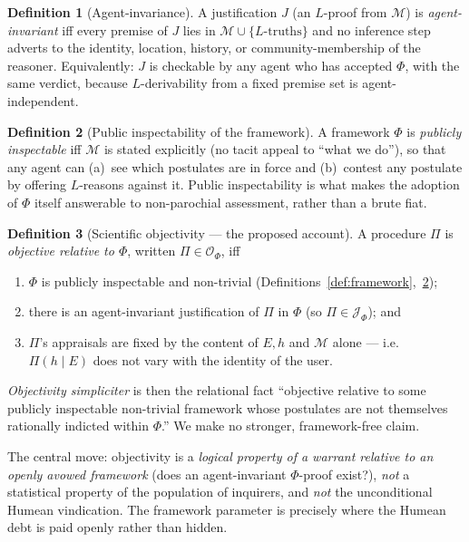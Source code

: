 \documentclass{amsart}
\theoremstyle{definition}
\newtheorem{definition}{Definition}
\theoremstyle{plain}
\theoremstyle{remark}
\begin{document}
\begin{definition}[Agent-invariance]\label{def:invariance}
A justification $J$ (an $L$-proof from $\mathcal{M}$) is \emph{agent-invariant}
iff every premise of $J$ lies in $\mathcal{M}\cup\{L\text{-truths}\}$ and no
inference step adverts to the identity, location, history, or
community-membership of the reasoner. Equivalently: $J$ is checkable by any
agent who has accepted $\Phi$, with the same verdict, because $L$-derivability
from a fixed premise set is agent-independent.
\end{definition}

\begin{definition}[Public inspectability of the framework]\label{def:public}
A framework $\Phi$ is \emph{publicly inspectable} iff $\mathcal{M}$ is stated
explicitly (no tacit appeal to ``what we do''), so that any agent can (a)~see
which postulates are in force and (b)~contest any postulate by offering
$L$-reasons against it. Public inspectability is what makes the adoption of
$\Phi$ itself answerable to non-parochial assessment, rather than a brute fiat.
\end{definition}

\begin{definition}[Scientific objectivity --- the proposed account]
\label{def:objectivity}
A procedure $\Pi$ is \emph{objective relative to $\Phi$}, written
$\Pi\in\mathcal{O}_\Phi$, iff
\begin{enumerate}
\item[(O1)] $\Phi$ is publicly inspectable and non-trivial
(Definitions~\ref{def:framework},~\ref{def:public});
\item[(O2)] there is an agent-invariant justification of $\Pi$ in $\Phi$
(so $\Pi\in\mathcal{J}_\Phi$); and
\item[(O3)] $\Pi$'s appraisals are fixed by the content of $E,h$ and
$\mathcal{M}$ alone --- i.e.\ $\Pi(h\mid E)$ does not vary with the identity of
the user.
\end{enumerate}
\emph{Objectivity simpliciter} is then the relational fact ``objective relative
to some publicly inspectable non-trivial framework whose postulates are not
themselves rationally indicted within $\Phi$.'' We make no stronger,
framework-free claim.
\end{definition}

The central move: objectivity is a \emph{logical property of a warrant relative
to an openly avowed framework} (does an agent-invariant $\Phi$-proof exist?),
\emph{not} a statistical property of the population of inquirers, and \emph{not}
the unconditional Humean vindication. The framework parameter is precisely
where the Humean debt is paid openly rather than hidden.
\end{document}
